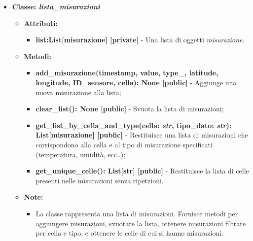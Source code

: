 \begin{itemize}
    \item\textbf{Classe: \textit{lista\_misurazioni}}
    \begin{itemize}
        \item\textbf{Attributi:}
        \begin{itemize}
            \item \textbf{list:List[misurazione] [private]} - Una lista di oggetti \textit{misurazione}.
        \end{itemize}
        \item \textbf{Metodi: }
        \begin{itemize}
            \item \textbf{add\_misurazione(timestamp, value, type\_, latitude, longitude, ID\_sensore, cella): None [public]} - Aggiunge una nuova misurazione alla lista;
            \item \textbf{clear\_list(): None [public]} - Svuota la lista di misurazioni;
            \item \textbf{get\_list\_by\_cella\_and\_type(cella: \textit{str}, tipo\_dato: \textit{str}): List[misurazione] [public]} - Restituisce una lista di misurazioni che corrispondono alla cella e al tipo di misurazione specificati (temperatura, umidità, ecc..);
            \item \textbf{get\_unique\_celle(): List[str] [public]} - Restituisce la lista di celle presenti nelle misurazioni senza ripetzioni.
        \end{itemize}
        \item\textbf{Note:}
        \begin{itemize}
            \item La classe rappresenta una lista di misurazioni. Fornisce metodi per aggiungere misurazioni, svuotare la lista, ottenere misurazioni filtrate per cella e tipo, e ottenere le celle di cui si hanno misurazioni.
        \end{itemize}
    \end{itemize}


\end{itemize}

